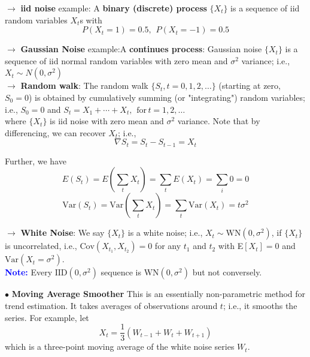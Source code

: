 \documentclass[letterpaper, 10.5pt,landscape]{article}
\begin{document}
\begin{multicols*}{3}
$\rightarrow$ \textbf{iid noise} example: A \textbf{binary (discrete) process} $\{X_{t} \}$ is a sequence of iid random variables $X_{t}$s with 
\vspace{-3pt}
\[P(X_{t} = 1) = 0.5, \hspace{5pt} P(X_{t} = -1) = 0.5 \]

\vspace{3pt}
$\rightarrow$ \textbf{Gaussian Noise} example:A \textbf{continues process}: Gaussian noise $\{X_{t}\}$ is a sequence of iid normal random variables with zero mean and $\sigma^{2}$ variance; i.e., \(X_{t} \sim N (0, \sigma^{2})\) \\


\vspace{3pt}
$\rightarrow$ \textbf{Random walk}: The random walk $\{S_{t}, t=0,1,2, \ldots \}$ (starting at zero, $S_{0} = 0$) is obtained by cumulatively summing (or "integrating") random variables; i.e., $S_{0}=0$ and $S_{t} = X_{1} + \cdots + X_{t}, \hspace{5pt} \text{for} \hspace{2pt} t=1,2,\ldots$ \\
where $\{X_{t} \}$ is iid noise with zero mean and $\sigma^{2}$ variance. Note that by differencing, we can recover $X_{t}$; i.e.,
\vspace{-3pt}
\[\nabla  S_{t} = S_{t} - S_{t-1} = X_{t} \]

\vspace{-3pt}
Further, we have
\vspace{-3pt}
\[E(S_{t}) =  E\left( \sum_{t} X_{t} \right) = \sum_{t} E(X_{t}) = \sum_{i} 0 = 0\]
\vspace{-3pt}
\[\text{Var}(S_{t}) = \text{Var}\left(\sum_{t} X_{t} \right) = \sum_{t} \text{Var}(X_{t}) = t\sigma^{2} \]


$\rightarrow$ \textbf{White Noise}: We say $\{X_{t} \}$ is a white noise; i.e., $X_{t} \sim \text{WN}(0, \sigma^{2})$, if $\{X_{t} \}$ is uncorrelated, i.e., $\text{Cov}\left(X_{t_{1}}, X_{t_{2}}\right) = 0 $ for any $t_{1}$ and $t_{2}$ with E$[X_{t}] = 0$ and $\text{Var}(X_{t} = \sigma^{2})$. \\

\vspace{3pt}
\textcolor{blue}{\textbf{Note:}} Every $\text{IID}(0, \sigma^{2})$ sequence is $\text{WN}(0, \sigma^{2})$ but not conversely. \\


\vspace{5pt}

$\bullet$ \textbf{Moving Average Smoother} This is an essentially non-parametric method for trend estimation. It takes averages of observations around $t$; i.e., it smooths the series. For example, let 
\vspace{-3pt}
\[X_{t} = \frac{1}{3}\left(W_{t-1} + W_{t} + W_{t+1} \right)\]
which is a three-point moving average of the white noise series $W_{t}$. 


\end{multicols*}
\end{document}
